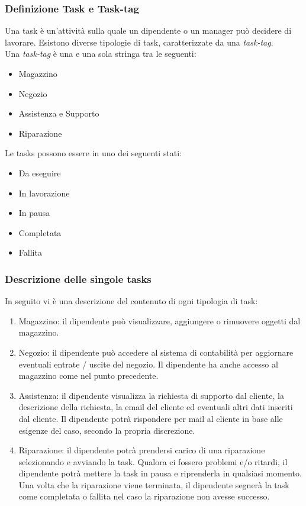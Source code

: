 \documentclass{report}
\begin{document}
\subsubsection*{Definizione Task e Task-tag}
Una task è un'attività sulla quale un dipendente o un manager può decidere di lavorare. Esistono diverse tipologie di task, caratterizzate da una \textit{task-tag}. \\
Una \textit{task-tag} è una e una sola stringa tra le seguenti:
\begin{itemize}
	\item Magazzino
	\item Negozio
	\item Assistenza e Supporto
	\item Riparazione
\end{itemize}
Le tasks possono essere in uno dei seguenti stati: 
\begin{itemize}
	\item Da eseguire
	\item In lavorazione
	\item In pausa
	\item Completata
	\item Fallita
\end{itemize}

\subsubsection*{Descrizione delle singole tasks}

In seguito vi è una descrizione del contenuto di ogni tipologia di task:


\begin{enumerate}
	\item Magazzino: il dipendente può visualizzare, aggiungere o rimuovere oggetti dal magazzino.
	
	\item Negozio: il dipendente può accedere al sistema di contabilità per aggiornare eventuali entrate / uscite del negozio. Il dipendente ha anche accesso al magazzino come nel punto precedente.
	
	\item Assistenza: il dipendente visualizza la richiesta di supporto dal cliente, la descrizione della richiesta, la email del cliente ed eventuali altri dati inseriti dal cliente. Il dipendente potrà rispondere per mail al cliente in base alle esigenze del caso, secondo la propria discrezione.
	
	\item Riparazione: il dipendente potrà prendersi carico di una riparazione selezionando e avviando la task. Qualora ci fossero problemi e/o ritardi, il dipendente potrà mettere la task in pausa e riprenderla in qualsiasi momento. Una volta che la riparazione viene terminata, il dipendente segnerà la task come completata o fallita nel caso la riparazione non avesse successo.
	
\end{enumerate}
\end{document}
